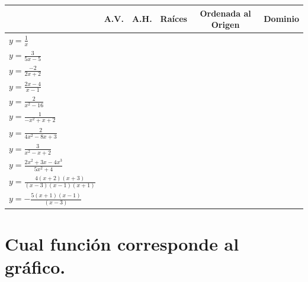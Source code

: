 \documentclass[a4paper,11pt,spanish,sans]{exam}
\newcommand{\Ts}{\rule{0pt}{2.6ex}}       %
\newcommand{\Bs}{\rule[-1.2ex]{0pt}{0pt}} %
\begin{document}
\begin{center}
\label{completar}
\begin{tabular}{|l|c|c|c|c|c|}
\hline
                      & A.V. & A.H. & Raíces & Ordenada al Origen & Dominio \Ts \Bs \\ \hline
$y=\frac{1}{x}$  &   &   &   &   &  \Ts \Bs     \\ \hline
$y=\frac{3}{5x-5}$  &   &   &   &   &  \Ts \Bs     \\ \hline
$y=\frac{-2}{2x+2}$  &   &   &   &   &  \Ts \Bs     \\ \hline
$y=\frac{2x-4}{x-1}$  &   &   &   &   &  \Ts \Bs     \\ \hline
$y=\frac{2}{x^2-16}$  &   &   &   &   &  \Ts \Bs     \\ \hline
$y=\frac{1}{-x^2+x+2}$  &   &   &   &   &  \Ts \Bs     \\ \hline
$y=\frac{2}{4x^2-8x+3}$  &   &   &   &   &  \Ts \Bs     \\ \hline
$y=\frac{3}{x^2-x+2}$  &   &   &   &   &  \Ts \Bs     \\ \hline
$y=\frac{2x^2+3x-4x^3}{5x^2+4}$  &   &   &   &   &  \Ts \Bs     \\ \hline
$y=\frac{4(x+2)(x+3)}{(x-3)(x-1)(x+1)}$   &   &   &   &   &   \Ts \Bs     \\ \hline
$y=-\frac{5(x+1)(x-1)}{(x-3)}$   &   &   &   &   &   \Ts \Bs     \\ \hline
\end{tabular}
\end{center}

%

\section{Cual función corresponde al gráfico.} 
\end{document}
